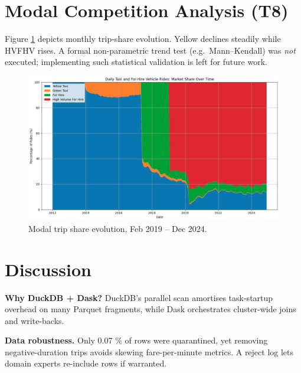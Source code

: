 \documentclass[conference]{IEEEtran}
\begin{document}

  \section{Modal Competition Analysis (T8)}\label{sec:impact}
  Figure \ref{fig:mode-evolution} depicts monthly trip-share evolution.
  Yellow declines steadily while HVFHV rises.
  A formal non-parametric trend test (e.g.\ Mann–Kendall) was \emph{not}
  executed; implementing such statistical validation is left for future
  work.

  \begin{figure}[htbp]
    \centering
    \includegraphics[width=0.88\linewidth]{figures/mode_evolution.png}
    \caption{Modal trip share evolution, Feb 2019 – Dec 2024.}
    \label{fig:mode-evolution}
  \end{figure}

  \section{Discussion}\label{sec:discussion}
  \textbf{Why DuckDB + Dask?}
  DuckDB’s parallel scan amortises task-startup overhead on many Parquet
  fragments, while Dask orchestrates cluster-wide joins and write-backs.

  \textbf{Data robustness.}
  Only 0.07 \% of rows were quarantined, yet removing
  negative-duration trips avoids skewing fare-per-minute metrics.  A
  reject log lets domain experts re-include rows if warranted.
\end{document}
